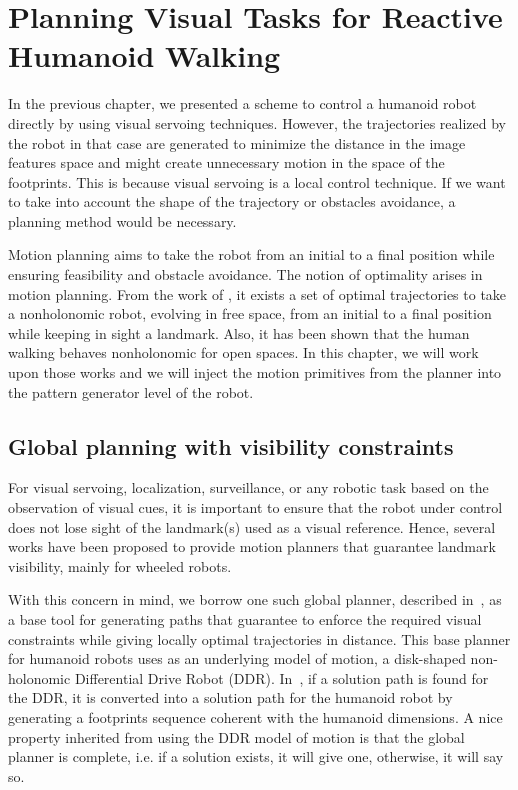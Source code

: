 \chapter{Planning Visual Tasks for Reactive Humanoid Walking} 
\label{Chap:Visual-Planning}

In the previous chapter, we presented a scheme to control a humanoid robot directly by using visual servoing techniques. However, the trajectories realized by the robot in that case are generated to minimize the distance in the image features space and might create unnecessary motion in the space of the footprints. This is because visual servoing is a local control technique. If we want to take into account the shape of the trajectory or obstacles avoidance, a planning method would be necessary.

Motion planning aims to take the robot from an initial to a final position while ensuring feasibility and obstacle avoidance. The notion of optimality arises in motion planning. From the work of \citep{Salaris:2010, jib-IJHR2010}, it exists a set of optimal trajectories to take a nonholonomic robot, evolving in free space, from an initial to a final position while keeping in sight a landmark. Also, it has been shown that the human walking behaves nonholonomic for open spaces. In this chapter, we will work upon those works and we will inject the motion primitives from the planner into the pattern generator level of the robot.

\section{Global planning with visibility constraints}

\label{sec:globalplanning}

For visual servoing, localization, surveillance, or any robotic task based on the observation of visual cues, it is important to ensure that the robot under control does not lose sight of the landmark(s) used as a visual reference. Hence, several works have been proposed to provide motion planners that guarantee landmark visibility, mainly for wheeled robots.

With this concern in mind, we borrow one such global planner, described in~\citep{jib-IJHR2010},  as a base tool for generating paths that guarantee to enforce the required visual constraints while giving locally optimal trajectories in distance. This base planner for humanoid robots uses as an underlying model of motion, a disk-shaped non-holonomic Differential Drive Robot (DDR). In~\citep{jib-IJHR2010}, if a solution path is found for the DDR, it is converted into a solution path for the humanoid robot by generating a footprints sequence coherent with the humanoid dimensions. A nice property inherited from using the DDR model of motion is that the global planner is complete, i.e.  if a solution exists, it will give one, otherwise, it will say so.

